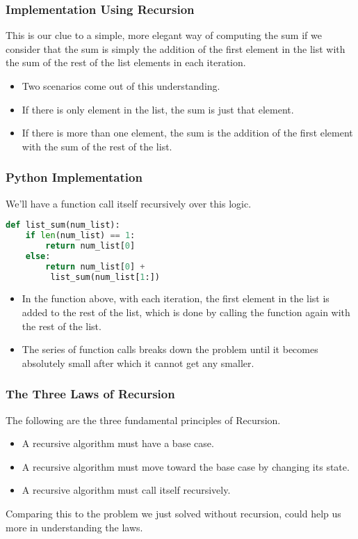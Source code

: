 \documentclass{beamer}
\begin{document}
\begin{frame}[fragile]
\frametitle{Implementation Using Recursion}
This is our clue to a simple, more elegant way of computing the sum if we consider that the sum is simply the addition of the first element in the list with the sum of the rest of the list elements in each iteration.
\begin{itemize}
\item Two scenarios come out of this understanding.
\item If there is only element in the list, the sum is just that element.
\item If there is more than one element, the sum is the addition of the first element with the sum of the rest of the list. 
\end{itemize}

\end{frame}

\begin{frame}[fragile]
\frametitle{Python Implementation}
We'll have a function call itself recursively over this logic. 
\begin{lstlisting}[language=Python]
def list_sum(num_list):
    if len(num_list) == 1:
        return num_list[0]
    else:
        return num_list[0] +
         list_sum(num_list[1:])
\end{lstlisting}
\begin{itemize}
\item In the function above, with each iteration, the first element in the list is added to the rest of the list, which is done by calling the function again with the rest of the list.
\item The series of function calls breaks down the problem until it becomes absolutely small after which it cannot get any smaller.
\end{itemize}
\end{frame}

\begin{frame}
\frametitle{The Three Laws of Recursion}
The following are the three fundamental principles of Recursion.
\begin{itemize}
\item A recursive algorithm must have a base case.
\item A recursive algorithm must move toward the base case by changing its state.
\item A recursive algorithm must call itself recursively.
\end{itemize}
Comparing this to the problem we just solved without recursion, could help us more in understanding the laws.
\end{frame}
\end{document}
